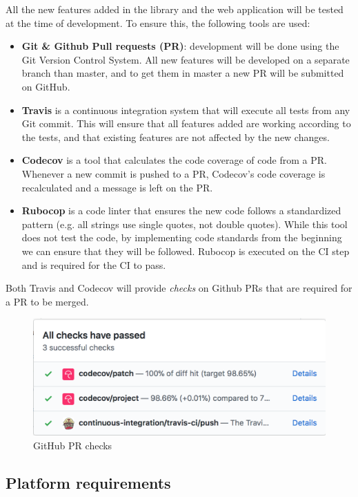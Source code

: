 All the new features added in the library and the web application will be tested at the time of development. To ensure this, the following tools are used:
\begin{itemize}
  \item \textbf{Git \& Github Pull requests (PR)}: development will be done using the Git Version Control System. All new features will be developed on a separate branch than master, and to get them in master a new PR will be submitted on GitHub.
  \item \textbf{Travis} is a continuous integration system that will execute all tests from any Git commit. This will ensure that all features added are working according to the tests, and that existing features are not affected by the new changes.
  \item \textbf{Codecov} is a tool that calculates the code coverage of code from a PR. Whenever a new commit is pushed to a PR, Codecov's code coverage is recalculated and a message is left on the PR.
  \item \textbf{Rubocop} is a code linter that ensures the new code follows a standardized pattern (e.g. all strings use single quotes, not double quotes). While this tool does not test the code, by implementing code standards from the beginning we can ensure that they will be followed. Rubocop is executed on the CI step and is required for the CI to pass.
\end{itemize}
Both Travis and Codecov will provide \textit{checks} on Github PRs that are required for a PR to be merged.

\begin{figure}[htp]
    \centering
    \includegraphics[width=(\linewidth / 3 * 2)]{Chapters/3-RequirementAndSpecifications/github_checks.png}
    \caption{GitHub PR checks}
    \label{fig:github_pr}
\end{figure}

\subsection{Platform requirements}

